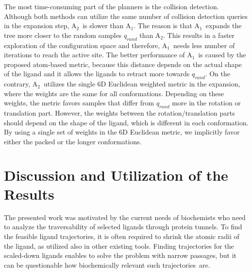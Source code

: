 \documentclass[usletter, 10pt, conference]{ieeeconf} %
\def\qrand{q_{rand}}
\def\RA{A$_{1}$}
\def\RB{A$_{2}$}
\begin{document}
\vspace{-3mm}
The most time-consuming part of the planners is the collision detection. 
Although both methods can utilize the same number of collision detection queries in the expansion step, \RB\ is slower than \RA.
The reason is that \RA\ expands the tree more closer to the random samples $\qrand$ than \RB.
This results in a faster exploration of the configuration space and therefore, \RA\ needs less number of iterations to reach the active site.
The better performance of \RA\ is caused by the proposed atom-based metric, because this distance depends on the actual shape of the ligand and 
it allows the ligands to retract more towards $\qrand$.
On the contrary, \RB\ utilizes the single 6D Euclidean weighted metric in the expansion, where the weights are the same for all conformations.
Depending on these weights, the metric favors samples that differ from $\qrand$ more in the rotation or translation part.
However, the weights between the rotation/translation parts should depend on the shape of the ligand, which is different in each conformation.
By using a single set of weights in the 6D Euclidean metric, we implicitly favor either the packed or the longer conformations.


\section{Discussion and Utilization of the Results}

The presented work was motivated by the current needs of biochemists who need to analyze the traversability of selected ligands through protein tunnels.
To find the feasible ligand trajectories, it is often required to shrink the atomic radii of the ligand, as utilized also in other existing tools.
Finding trajectories for the scaled-down ligands enables to solve the problem with narrow passages, but it can be questionable how biochemically relevant such trajectories~are.
\end{document}

